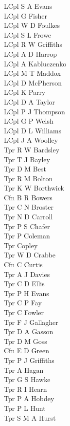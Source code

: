 \begin{multicols}{4}
  LCpl S A Evans \\
  LCpl G Fisher \\
  LCpl W D Foulkes \\
  LCpl S L Frowe \\
  LCpl R W Griffiths \\
  LCpl A D Harrop \\
  LCpl A Kabluczenko \\
  LCpl M T Maddox \\
  LCpl D McPherson \\
  LCpl K Parry \\
  LCpl D A Taylor \\
  LCpl P J Thompson \\
  LCpl G P Welsh \\
  LCpl D L Williams \\
  LCpl J A Woolley \\
  Tpr R W Bardsley \\
  Tpr T J Bayley \\
  Tpr D M Best \\
  Tpr R M Bolton \\
  Tpr K W Borthwick \\
  Cfn B R Bowers \\
  Tpr C N Broster \\
  Tpr N D Carroll \\
  Tpr P S Chafer \\
  Tpr P Coleman \\
  Tpr Copley \\
  Tpr W D Crabbe \\
  Cfn C Curtis \\
  Tpr A J Davies \\
  Tpr C D Ellis \\
  Tpr P H Evans \\
  Tpr C P Fay \\
  Tpr C Fowler \\
  Tpr F J Gallagher \\
  Tpr D A Gasson \\
  Tpr D M Goss \\
  Cfn E D Green \\
  Tpr P J Griffiths \\
  Tpr A Hagan \\
  Tpr G S Hawke \\
  Tpr R I Hearn \\
  Tpr P A Hobdey \\
  Tpr P L Hunt \\
  Tpr S M A Hurst \\

\end{multicols}
